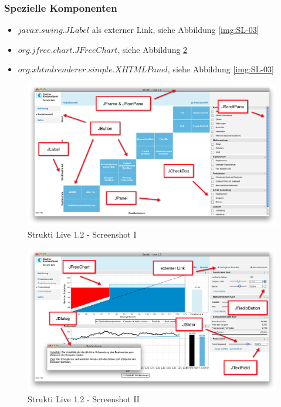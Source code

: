   \subsubsection{Spezielle Komponenten}
  
  \begin{itemize}
    \item \(javax.swing.JLabel\) als externer Link, siehe Abbildung
    \ref{img:SL-03}
    \item \(org.jfree.chart.JFreeChart\), siehe Abbildung \ref{img:SL-02}
    \item \(org.xhtmlrenderer.simple.XHTMLPanel\), siehe Abbildung
    \ref{img:SL-03}
  \end{itemize}
  
  \begin{figure}[htb]
    \begin{center}
      \includegraphics[width=\textwidth]{./image/SL/SL-01.png}
      \caption{Strukti Live 1.2 - Screenshot I}
      \label{img:SL-01}
    \end{center}
  \end{figure}
  
  \begin{figure}[htb]
    \begin{center}
      \includegraphics[width=\textwidth]{./image/SL/SL-02.png}
      \caption{Strukti Live 1.2 - Screenshot II}
      \label{img:SL-02}
    \end{center}
  \end{figure}
  

